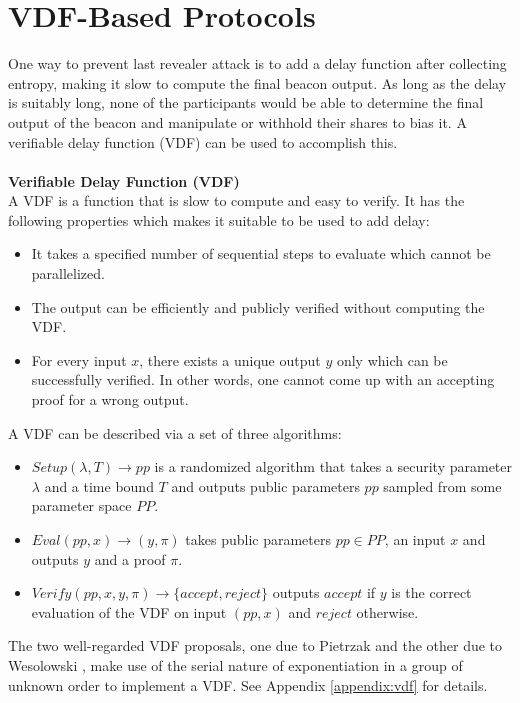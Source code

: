 \documentclass[letterpaper,twocolumn,10pt]{article}
\theoremstyle{definition}
\theoremstyle{remark}
\begin{document}
\section{VDF-Based Protocols}
\label{section:vdf}
One way to prevent last revealer attack is to add a delay function after collecting entropy, making it slow to compute the final beacon output. As long as the delay is suitably long, none of the participants would be able to determine the final output of the beacon and manipulate or withhold their shares to bias it. A verifiable delay function (VDF) \cite{boneh2018verifiable} can be used to accomplish this. \\\\
\textbf{Verifiable Delay Function (VDF)}\\
A VDF is a function that is slow to compute and easy to verify. It has the following properties which makes it suitable to be used to add delay:
\begin{itemize}
    \item It takes a specified number of sequential steps to evaluate which cannot be parallelized.
    \item The output can be efficiently and publicly verified without computing the VDF.
    \item For every input $x$, there exists a unique output $y$ only which can be successfully verified. In other words, one cannot come up with an accepting proof for a wrong output.
\end{itemize}
A VDF can be described via a set of three algorithms:
\begin{itemize}
\item $Setup(\lambda, T) \rightarrow pp$ is a randomized algorithm that takes a security parameter $\lambda$ and a time bound $T$  and outputs public parameters $pp$ sampled from some parameter space $PP$.
\item $Eval(pp, x) \rightarrow (y, \pi)$ takes public parameters $pp\in PP$, an input $x$ and outputs $y$ and a proof $\pi$.
\item $Verify(pp, x, y, \pi) \rightarrow \{accept, reject\}$ outputs $accept$ if $y$ is the correct evaluation of the VDF on input $(pp, x)$ and $reject$ otherwise.
\end{itemize}
 The two well-regarded VDF proposals, one due to Pietrzak \cite{pietrzak2018simple} and the other due to Wesolowski \cite{wesolowski2019efficient}, make use of the serial nature of exponentiation in a group of unknown order to implement a VDF. See Appendix \ref{appendix:vdf} for details.
\end{document}
